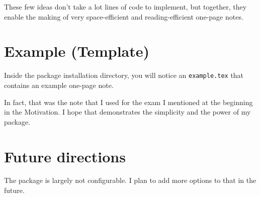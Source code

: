 \documentclass{article}
\begin{document}
These few ideas don't take a lot lines of code to implement, but together, they
enable the making of very space-efficient and reading-efficient one-page notes.

\section{Example (Template)}
Inside the package installation directory, you will notice an
\texttt{example.tex} that contains an example one-page note.

In fact, that was the note that I used for the exam I mentioned at the beginning
in the Motivation. I hope that demonstrates the simplicity and the power of my
package.

\section{Future directions}
The package is largely not configurable. I plan to add more options to that in
the future.
\end{document}
